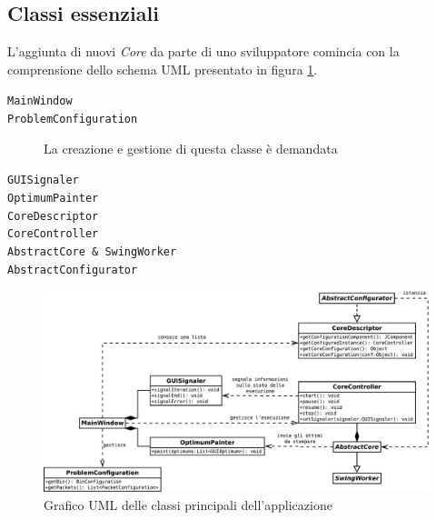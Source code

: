 \subsection{Classi essenziali}
L'aggiunta di nuovi \emph{Core} da parte di uno sviluppatore comincia con la comprensione dello schema UML presentato in figura \ref{fig:uml_classi}.
\begin{description}
	\item[\texttt{MainWindow}]
	\item[\texttt{ProblemConfiguration}] La creazione e gestione di questa classe è demandata 
	\item[\texttt{GUISignaler}]
	\item[\texttt{OptimumPainter}]
	\item[\texttt{CoreDescriptor}]
	\item[\texttt{CoreController}]
	\item[\texttt{AbstractCore \& SwingWorker}]
	\item[\texttt{AbstractConfigurator}]
\end{description}


\begin{figure}[h!tp]
 \centering
 \includegraphics[width=\textwidth]{./img/uml_classi.pdf}
 \caption{Grafico UML delle classi principali dell'applicazione}
 \label{fig:uml_classi}
\end{figure}
